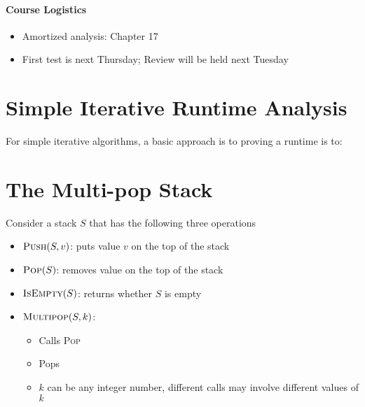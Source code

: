 \documentclass[11  pt]{article}
\begin{document}
	
	
	
	\paragraph{Course Logistics}
	
	\begin{itemize}
		\item Amortized analysis: Chapter 17
		\item First test is next Thursday; Review will be held next Tuesday
	\end{itemize}
	
	\section{Simple Iterative Runtime Analysis}
	For simple iterative algorithms, a basic approach is to proving a runtime is to:
	
	
	\newpage
	
	\section{The Multi-pop Stack}
	Consider a stack $S$ that has the following three operations
	\begin{itemize}
		\item $\textsc{Push}(S,v)$: puts value $v$ on the top of the stack
		\item $\textsc{Pop}(S)$: removes value on the top of the stack
		\item $\textsc{IsEmpty}(S)$: returns whether $S$ is empty
		\item $\textsc{Multipop}(S,k)$: 
		\begin{itemize}
			
			\item Calls \textsc{Pop} \\%
			\item Pops \\%
			\item $k$ can be any integer number, different calls may involve different values of $k$
		\end{itemize}
	\end{itemize}
	
	\vfill
	
\end{document}
